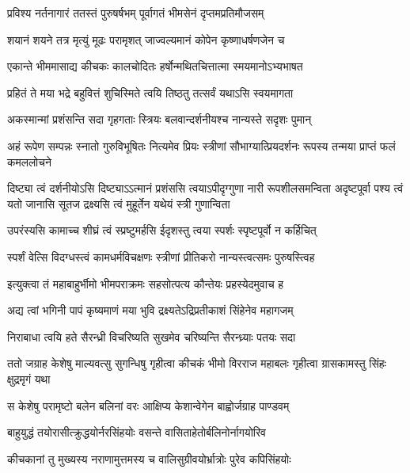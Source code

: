\twolineshloka
{प्रविश्य नर्तनागारं ततस्तं पुरुषर्षभम्}
{पूर्वागतं भीमसेनं दृप्तमप्रतिमौजसम्}


\twolineshloka
{शयानं शयने तत्र मृत्युं मूढः परामृशत्}
{जाज्वल्यमानं कोपेन कृष्णाधर्षणजेन च}


\twolineshloka
{एकान्ते भीममासाद्य कीचकः कालचोदितः}
{हर्षोन्मथितचित्तात्मा स्मयमानोऽभ्यभाषत}


\twolineshloka
{प्रहितं ते मया भद्रे बहुवित्तं शुचिस्मिते}
{त्वयि तिष्ठतु तत्सर्वं यथाऽसि स्वयमागता}


\twolineshloka
{अकस्मान्मां प्रशंसन्ति सदा गृहगताः स्त्रियः}
{बलवान्दर्शनीयश्च नान्यस्ते सदृशः पुमान्}


\threelineshloka
{अहं रूपेण सम्पन्नः स्नातो गुरुविभूषितः}
{नित्यमेव प्रियः स्त्रीणां सौभाग्यात्प्रियदर्शनः}
{रूपस्य तन्मया प्राप्तं फलं कमललोचने}




\onelineshloka
{दिष्ट्या त्वं दर्शनीयोऽसि दिष्ट्याऽऽत्मानं प्रशंससि}
\threelineshloka
{त्वयाऽपीदृग्गुणा नारी रूपशीलसमन्विता}
{अदृष्टपूर्वा पश्य त्वं यतो जानासि सूतज}
{द्रक्ष्यसि त्वं मुहूर्तेन यथेयं स्त्री गुणान्विता}


\twolineshloka
{उपरंस्यसि कामाच्च शीघ्रं त्वं स्प्रष्टुमर्हसि}
{ईदृशस्तु त्वया स्पर्शः स्पृष्टपूर्वो न कर्हिचित्}


\twolineshloka
{स्पर्शं वेत्सि विदग्धस्त्वं कामधर्मविचक्षणः}
{स्त्रीणां प्रीतिकरो नान्यस्त्वत्समः पुरुषस्त्विह}



\twolineshloka
{इत्युक्त्वा तं महाबाहुर्भीमो भीमपराक्रमः}
{सहसोत्पत्य कौन्तेयः प्रहस्येदमुवाच ह}


\twolineshloka
{अद्य त्वां भगिनी पापं कृष्यमाणं मया भुवि}
{द्रक्ष्यतेऽद्रिप्रतीकाशं सिंहेनेव महागजम्}


\twolineshloka
{निराबाधा त्वयि हते सैरन्ध्री विचरिष्यति}
{सुखमेव चरिष्यन्ति सैरन्ध्र्याः पतयः सदा}


\onelineshloka
{ततो जग्राह केशेषु माल्यवत्सु सुगन्धिषु}
\twolineshloka
{गृहीत्वा कीचकं भीमो विरराज महाबलः}
{गृहीत्वा ग्रासकामस्तु सिंहः क्षुद्रमृगं यथा}


\twolineshloka
{स केशेषु परामृष्टो बलेन बलिनां वरः}
{आक्षिप्य केशान्वेगेन बाह्वोर्जग्राह पाण्डवम्}


\twolineshloka
{बाहुयुद्धं तयोरासीत्क्रुद्धयोर्नरसिंहयोः}
{वसन्ते वासिताहेतोर्बलिनोर्नागयोरिव}


\twolineshloka
{कीचकानां तु मुख्यस्य नराणामुत्तमस्य च}
{वालिसुग्रीवयोर्भ्रात्रोः पुरेव कपिसिंहयोः}



